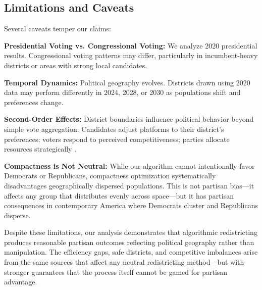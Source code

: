 \subsection{Limitations and Caveats}

Several caveats temper our claims:

\textbf{Presidential Voting vs. Congressional Voting:} We analyze 2020 presidential results. Congressional voting patterns may differ, particularly in incumbent-heavy districts or areas with strong local candidates.

\textbf{Temporal Dynamics:} Political geography evolves. Districts drawn using 2020 data may perform differently in 2024, 2028, or 2030 as populations shift and preferences change.

\textbf{Second-Order Effects:} District boundaries influence political behavior beyond simple vote aggregation. Candidates adjust platforms to their district's preferences; voters respond to perceived competitiveness; parties allocate resources strategically \cite{pegden2017computational}.

\textbf{Compactness is Not Neutral:} While our algorithm cannot intentionally favor Democrats or Republicans, compactness optimization systematically disadvantages geographically dispersed populations. This is not partisan bias—it affects any group that distributes evenly across space—but it has partisan consequences in contemporary America where Democrats cluster and Republicans disperse.

Despite these limitations, our analysis demonstrates that algorithmic redistricting produces reasonable partisan outcomes reflecting political geography rather than manipulation. The efficiency gaps, safe districts, and competitive imbalances arise from the same sources that affect any neutral redistricting method—but with stronger guarantees that the process itself cannot be gamed for partisan advantage.

